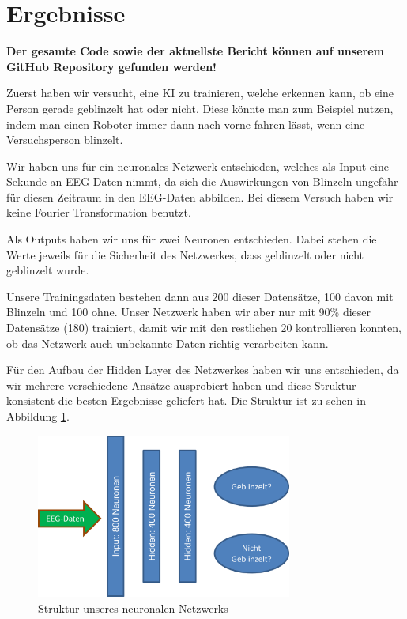 \documentclass{scrartcl}
\begin{document}
	
	\newpage
	\newpage

	\section{Ergebnisse}

	\textbf{Der gesamte Code sowie der aktuellste Bericht können auf unserem GitHub Repository gefunden werden!} \cite{InterpretingEEG}

	Zuerst haben wir versucht, eine KI zu trainieren, welche erkennen kann, ob eine Person gerade geblinzelt hat oder nicht. Diese könnte man zum Beispiel nutzen, indem man einen Roboter immer dann nach vorne fahren lässt, wenn eine Versuchsperson blinzelt.

	Wir haben uns für ein neuronales Netzwerk entschieden, welches als Input eine Sekunde an EEG-Daten nimmt, da sich die Auswirkungen von Blinzeln ungefähr für diesen Zeitraum in den EEG-Daten abbilden. Bei diesem Versuch haben wir keine Fourier Transformation benutzt.

	Als Outputs haben wir uns für zwei Neuronen entschieden. Dabei stehen die Werte jeweils für die Sicherheit des Netzwerkes, dass geblinzelt oder nicht geblinzelt wurde.

	Unsere Trainingsdaten bestehen dann aus 200 dieser Datensätze, 100 davon mit Blinzeln und 100 ohne. Unser Netzwerk haben wir aber nur mit 90\% dieser Datensätze (180) trainiert, damit wir mit den restlichen 20 kontrollieren konnten, ob das Netzwerk auch unbekannte Daten richtig verarbeiten kann.

	Für den Aufbau der Hidden Layer des Netzwerkes haben wir uns entschieden, da wir mehrere verschiedene Ansätze ausprobiert haben und diese Struktur konsistent die besten Ergebnisse geliefert hat. Die Struktur ist zu sehen in Abbildung \ref{NetzStruktur}.

	\begin{figure}[h!]
		\includegraphics[width=0.75\textwidth]{pictures/netzwerk-struktur.png}
		\caption{Struktur unseres neuronalen Netzwerks}
		\label{NetzStruktur}
	\end{figure}
\end{document}
